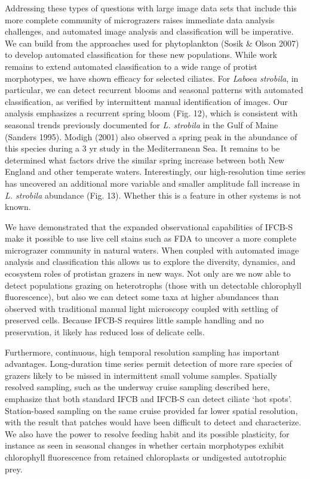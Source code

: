 Addressing these types of questions with large image data sets that include this more complete community of micrograzers raises immediate data analysis challenges, and automated image analysis and classification will be imperative. We can build from the approaches used for phytoplankton (Sosik \& Olson 2007) to develop automated classification for these new populations. While work remains to extend automated classification to a wide range of protist morphotypes, we have shown efficacy for selected ciliates. For \textit{Laboea strobila}, in particular, we can detect recurrent blooms and seasonal patterns with automated classification, as verified by intermittent
manual identification of images. Our analysis emphasizes a recurrent spring bloom (Fig. 12), which is
consistent with seasonal trends previously documented for \textit{L. strobila} in the Gulf of Maine (Sanders 1995). Modigh (2001) also observed a spring peak in the abundance of this species during a 3 yr study in the Mediterranean Sea. It remains to be determined what factors drive the similar spring increase between both New England and other temperate waters. Interestingly, our high-resolution time series has uncovered an additional more variable and smaller amplitude fall increase in \textit{L. strobila} abundance (Fig. 13). Whether this is a feature in other systems is not known.

We have demonstrated that the expanded observational capabilities of IFCB-S make it possible to use
live cell stains such as FDA to uncover a more complete micrograzer community in natural waters. When coupled with automated image analysis and classification this allows us to explore the diversity, dynamics, and ecosystem roles of protistan grazers in new ways. Not only are we now able to detect populations grazing on heterotrophs (those with un detectable chlorophyll fluorescence), but also we can detect some taxa at higher abundances than observed with traditional manual light microscopy coupled with settling of preserved cells. Because IFCB-S requires little sample handling and no preservation, it likely has reduced loss of delicate cells.

Furthermore, continuous, high temporal resolution sampling has important advantages. Long-duration
time series permit detection of more rare species of grazers likely to be missed in intermittent small
volume samples. Spatially resolved sampling, such as the underway cruise sampling described here, emphasize that both standard IFCB and IFCB-S can detect ciliate \lq{hot spots}\rq. Station-based sampling on the same cruise provided far lower spatial resolution, with the result that patches would have been difficult to detect and characterize. We also have the power to resolve feeding habit and its possible plasticity, for instance as seen in seasonal changes in whether certain morphotypes exhibit chlorophyll fluorescence from retained chloroplasts or undigested autotrophic prey.

